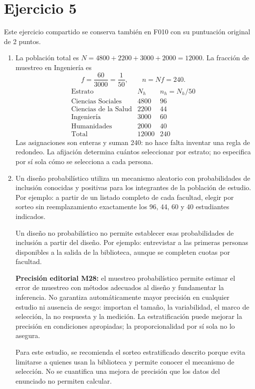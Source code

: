 \documentclass[11pt]{article}
\begin{document}
\section*{Ejercicio 5}
Este ejercicio compartido se conserva también en F010 con su puntuación original de 2 puntos.
\begin{enumerate}[label=(\alph*)]
\item La población total es $N=4800+2200+3000+2000=12000$. La fracción de muestreo en Ingeniería es
\[
f=\frac{60}{3000}=\frac1{50},\qquad n=Nf=\boxed{240}.
\]
\[
\begin{array}{l|r|r}
\text{Estrato}&N_h&n_h=N_h/50\\\hline
\text{Ciencias Sociales}&4800&96\\
\text{Ciencias de la Salud}&2200&44\\
\text{Ingeniería}&3000&60\\
\text{Humanidades}&2000&40\\\hline
\text{Total}&12000&240
\end{array}
\]
Las asignaciones son enteras y suman 240: no hace falta inventar una regla de redondeo. La afijación determina cuántos seleccionar por estrato; no especifica por sí sola cómo se selecciona a cada persona.
\item Un diseño probabilístico utiliza un mecanismo aleatorio con probabilidades de inclusión conocidas y positivas para los integrantes de la población de estudio. Por ejemplo: a partir de un listado completo de cada facultad, elegir por sorteo sin reemplazamiento exactamente los 96, 44, 60 y 40 estudiantes indicados.

Un diseño no probabilístico no permite establecer esas probabilidades de inclusión a partir del diseño. Por ejemplo: entrevistar a las primeras personas disponibles a la salida de la biblioteca, aunque se completen cuotas por facultad.

\textbf{Precisión editorial M28:} el muestreo probabilístico permite estimar el error de muestreo con métodos adecuados al diseño y fundamentar la inferencia. No garantiza automáticamente mayor precisión en cualquier estudio ni ausencia de sesgo: importan el tamaño, la variabilidad, el marco de selección, la no respuesta y la medición. La estratificación puede mejorar la precisión en condiciones apropiadas; la proporcionalidad por sí sola no lo asegura.

Para este estudio, se recomienda el sorteo estratificado descrito porque evita limitarse a quienes usan la biblioteca y permite conocer el mecanismo de selección. No se cuantifica una mejora de precisión que los datos del enunciado no permiten calcular.
\end{enumerate}
\end{document}
